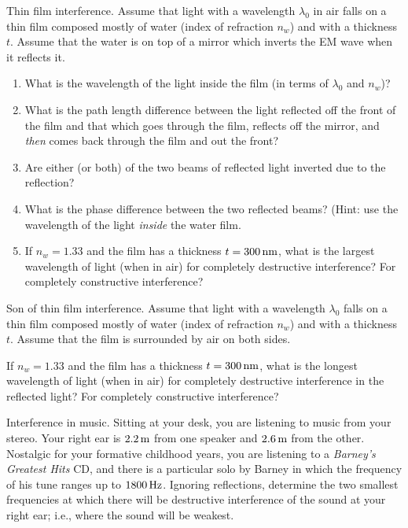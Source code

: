 \begin{aproblem}{Thin film interference.} 
  Assume that light with a wavelength $\lambda_0$ in air falls on a
  thin film composed mostly of water (index of refraction $n_w$) and
  with a thickness $t$.  Assume that the water is on top of a mirror
  which inverts the EM wave when it reflects it.
  \begin{enumerate}
  \item What is the wavelength of the light inside the film (in terms
    of $\lambda_0$ and $n_w$)?
  \item What is the path length difference between the light reflected
    off the front of the film and that which goes through the film,
    reflects off the mirror, and {\it then} comes back through the
    film and out the front?
  \item Are either (or both) of the two beams of reflected light
    inverted due to the reflection?
  \item What is the phase difference between the two reflected beams?
    (Hint: use the wavelength of the light {\it inside} the water
    film.
  \item If $n_w = 1.33$ and the film has a thickness $t =
    300\,\mbox{nm}$, what is the largest wavelength of light (when in
    air) for completely destructive interference?  For completely
    constructive interference?
  \end{enumerate}
\end{aproblem}


\begin{aproblem}{Son of thin film interference.} 
  Assume that light with a wavelength $\lambda_0$ falls on a thin film
  composed mostly of water (index of refraction $n_w$) and with a
  thickness $t$. Assume that the film is surrounded by air on both
  sides.

  If $n_w = 1.33$ and the film has a thickness $t = 300\,\mbox{nm}$,
  what is the longest wavelength of light (when in air) for completely
  destructive interference in the reflected light?  For completely
  constructive interference?
\end{aproblem}


\begin{aproblem}{Interference in music.}  
  Sitting at your desk, you are listening to music from your stereo.
  Your right ear is $2.2\,\mbox{m}$ from one speaker and $2.6\,\mbox{m}$
  from the other.  Nostalgic for your formative childhood years, you
  are listening to a {\it Barney's Greatest Hits} CD, and there is a
  particular solo by Barney in which the frequency of his tune ranges
  up to $1800\,\mbox{Hz}$.  Ignoring reflections, determine the two
  smallest frequencies at which there will be destructive interference
  of the sound at your right ear; i.e., where the sound will be
  weakest.
\end{aproblem}


